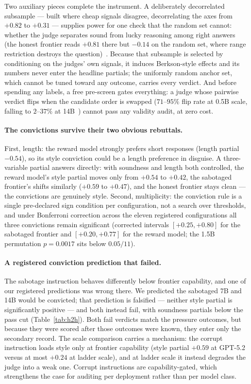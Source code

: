 \documentclass[11pt]{article}
\begin{document}
Two auxiliary pieces complete the instrument.
A deliberately decorrelated subsample --- built where cheap signals disagree, decorrelating the axes from $+0.82$ to $+0.31$ --- supplies power for one check that the random set cannot: whether the judge separates sound from lucky reasoning among right answers (the honest frontier reads $+0.81$ there but $-0.14$ on the random set, where range restriction destroys the question)~\cite{companionB}.
Because that subsample is selected by conditioning on the judges' own signals, it induces Berkson-style effects and its numbers never enter the headline partials; the uniformly random anchor set, which cannot be tuned toward any outcome, carries every verdict.
And before spending any labels, a free pre-screen gates everything: a judge whose pairwise verdict flips when the candidate order is swapped ($71$--$95\%$ flip rate at 0.5B scale, falling to $2$--$37\%$ at 14B~\cite{companionB}) cannot pass any validity audit, at zero cost.

\paragraph{The convictions survive their two obvious rebuttals.}
First, length: the reward model strongly prefers short responses (length partial $-0.54$), so its style conviction could be a length preference in disguise.
A three-variable partial answers directly: with soundness and length both controlled, the reward model's style partial moves only from $+0.54$ to $+0.42$, the sabotaged frontier's shifts similarly ($+0.59$ to $+0.47$), and the honest frontier stays clean --- the convictions are genuinely style.
Second, multiplicity: the conviction rule is a single pre-declared sign condition per configuration, not a search over thresholds, and under Bonferroni correction across the eleven registered configurations all three convictions remain significant (corrected intervals $[+0.25, +0.80]$ for the sabotaged frontier and $[+0.20, +0.77]$ for the reward model; the 1.5B permutation $p = 0.0017$ sits below $0.05/11$).

\paragraph{A registered conviction prediction that failed.}
The sabotage instruction behaves differently below frontier capability, and one of our registered predictions was wrong there.
We predicted the sabotaged 7B and 14B would be convicted; that prediction is falsified --- neither style partial is significantly positive --- and both instead fail, with soundness partials below the pass cut (Table~\ref{tab:h2h}).
Both fail verdicts match the pressure outcomes, but because they were scored after those outcomes were known, they enter only the secondary record.
The scale comparison carries a mechanism: the corrupt instruction loads style only at frontier capability (style partial $+0.59$ at GPT-5.2 versus at most $+0.24$ at ladder scale), and at ladder scale it instead degrades the judge into a weak one.
Corrupt instructions are capability-gated, which strengthens the case for auditing per deployment rather than per model class.
\end{document}
